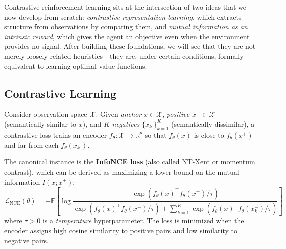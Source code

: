 \documentclass[11pt, letterpaper]{article}
\begin{document}
Contrastive reinforcement learning sits at the intersection of two ideas that we now develop from scratch: \textit{contrastive representation learning}, which extracts structure from observations by comparing them, and \textit{mutual information as an intrinsic reward}, which gives the agent an objective even when the environment provides no signal. After building these foundations, we will see that they are not merely loosely related heuristics---they are, under certain conditions, formally equivalent to learning optimal value functions.
 
\subsection{Contrastive Learning}
 
\begin{concept}
    Consider observation space \(\mathcal{X}\). Given \textit{anchor} \(x \in \mathcal{X}\), \textit{positive} \(x^+ \in \mathcal{X}\) (semantically similar to \(x\)), and \(K\) \textit{negatives} \(\{x^-_k\}_{k=1}^K\) (semantically dissimilar), a contrastive loss trains an encoder \(f_\theta : \mathcal{X} \to \mathbb{R}^d\) so that \(f_\theta(x)\) is close to \(f_\theta(x^+)\) and far from each \(f_\theta(x^-_k)\).
 
    The canonical instance is the \textbf{InfoNCE loss} (also called NT-Xent or momentum contrast), which can be derived as maximizing a lower bound on the mutual information \(I(x; x^+)\):
    \[
        \mathcal{L}_{\text{NCE}}(\theta) = -\mathbb{E} \left[ \log \frac{\exp(f_\theta(x)^\top f_\theta(x^+) / \tau)}{\exp(f_\theta(x)^\top f_\theta(x^+) / \tau) + \sum_{k=1}^K \exp(f_\theta(x)^\top f_\theta(x^-_k) / \tau)} \right]
    \]
    where \(\tau > 0\) is a \textit{temperature} hyperparameter. The loss is minimized when the encoder assigns high cosine similarity to positive pairs and low similarity to negative pairs.
\end{concept}
 
\end{document}
